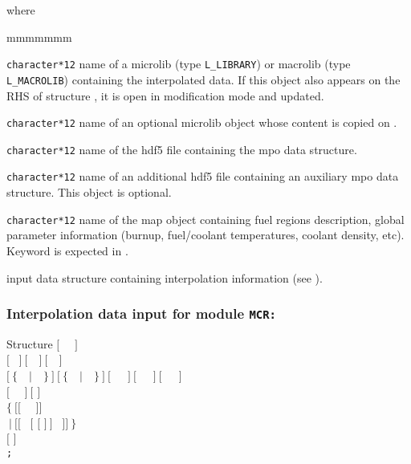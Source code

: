 \noindent where
\begin{ListeDeDescription}{mmmmmmm}

\item[\dusa{MLIB}] {\tt character*12} name of a {\sc microlib} (type {\tt L\_LIBRARY}) or {\sc macrolib} (type {\tt L\_MACROLIB}) containing the interpolated data.
If this object also appears on the RHS of structure , it is open in modification mode and updated.

\item[\dusa{MLIB2}] {\tt character*12} name of an optional {\sc microlib} object whose content is copied on .

\item[\dusa{MPONAM1}] {\tt character*12} name of the {\sc hdf5} file containing the {\sc mpo} data structure.

\item[\dusa{MPONAM2}] {\tt character*12} name of an additional {\sc hdf5} file containing an auxiliary
{\sc mpo} data structure. This object is optional.

\item[\dusa{MAPFL}] {\tt character*12} name of the {\sc map} object containing fuel regions description, global parameter
information (burnup, fuel/coolant temperatures, coolant density, etc). Keyword  is expected in .

\item[\dusa{mcr\_data}] input data structure containing interpolation information (see ).

\end{ListeDeDescription}

\subsubsection{Interpolation data input for module {\tt MCR:}}\label{sect:descmcr}

\vskip -0.5cm

\begin{DataStructure}{Structure }
$[$~ ~$]$ \\
$[$~ $]~[$~~$]~[$~~$]$ \\
$[~\{$~~$|$~~$\}~]~[~\{$~~$|$~~$\}~]~[$~~~$]~[$~~~$]~[$~~~$]$  \\
$[$~ ~$]~[$  $]$ \\
$\{~[[$~   ~$]]$ \\
$~|~[[$~   $[$  $[$  $]~]$ ~$]]~\}$ \\
$[$  $]$ \\
{\tt ;}
\end{DataStructure}

